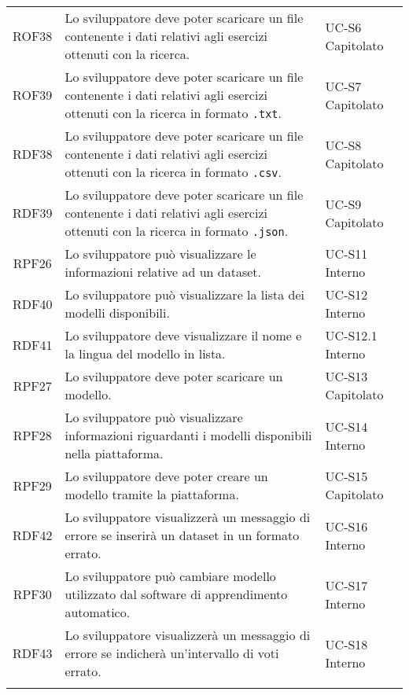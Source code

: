 \begin{tabularx}{\textwidth}{| c | p{10cm} | X |}
		ROF38 & Lo sviluppatore deve poter scaricare un file contenente i dati relativi agli esercizi ottenuti con la ricerca. & UC-S6 \newline Capitolato\\
		ROF39 & Lo sviluppatore deve poter scaricare un file contenente i dati relativi agli esercizi ottenuti con la ricerca in formato \texttt{.txt}. & UC-S7 \newline Capitolato\\
		RDF38 & Lo sviluppatore deve poter scaricare un file contenente i dati relativi agli esercizi ottenuti con la ricerca in formato \texttt{.csv}. & UC-S8 \newline Capitolato\\
		RDF39 & Lo sviluppatore deve poter scaricare un file contenente i dati relativi agli esercizi ottenuti con la ricerca in formato \texttt{.json}. & UC-S9 \newline Capitolato\\
		RPF26 & Lo sviluppatore può visualizzare le informazioni relative ad un dataset. & UC-S11 \newline Interno\\
		RDF40 & Lo sviluppatore può visualizzare la lista dei modelli disponibili. & UC-S12 \newline Interno\\
		RDF41 & Lo sviluppatore deve visualizzare il nome e la lingua del modello in lista. & UC-S12.1 \newline Interno\\
		RPF27 & Lo sviluppatore deve poter scaricare un modello. & UC-S13 \newline Capitolato\\
		RPF28 & Lo sviluppatore può visualizzare informazioni riguardanti i modelli disponibili nella piattaforma. & UC-S14 \newline Interno\\
		RPF29 & Lo sviluppatore deve poter creare un modello tramite la piattaforma. & UC-S15 \newline Capitolato\\ 
		RDF42 & Lo sviluppatore visualizzerà un messaggio di errore se inserirà un dataset in un formato errato. & UC-S16 \newline Interno\\
		RPF30 & Lo sviluppatore può cambiare modello utilizzato dal software di apprendimento automatico. & UC-S17 \newline Interno\\
		RDF43 & Lo sviluppatore visualizzerà un messaggio di errore se indicherà un'intervallo di voti errato. & UC-S18 \newline Interno\\
		\hline
		\caption{Tabella dei requisiti funzionali}
\end{tabularx}

